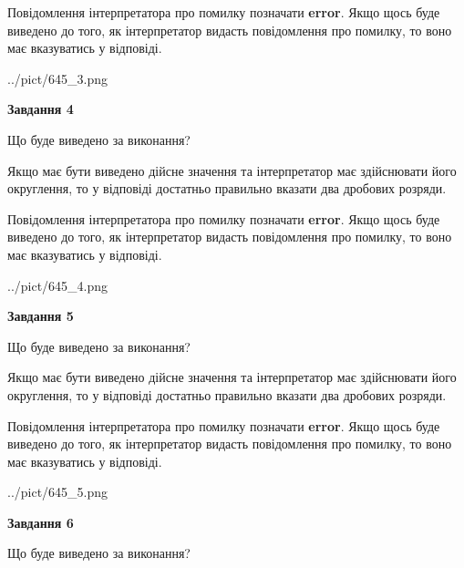 \documentclass[12pt, ukrainian]{article}
\begin{document}
{\begin {Large}
Повідомлення інтерпретатора про помилку позначати \textbf{error}.
Якщо щось буде виведено до того, як інтерпретатор видасть повідомлення про помилку, 
то воно має вказуватись у відповіді. \par

\begin{center}
	{../pict/645_3.png}
\end{center}
\newpage

{\begin {center}\textbf{Завдання 4}\end {center}}\par
Що буде виведено за виконання? \par

Якщо має бути виведено дійсне значення та інтерпретатор має здійснювати його округлення, 
то у відповіді достатньо правильно вказати два дробових розряди.

Повідомлення інтерпретатора про помилку позначати \textbf{error}.
Якщо щось буде виведено до того, як інтерпретатор видасть повідомлення про помилку, 
то воно має вказуватись у відповіді. \par

\begin{center}
	{../pict/645_4.png}
\end{center}
\newpage

{\begin {center}\textbf{Завдання 5}\end {center}}\par
Що буде виведено за виконання? \par

Якщо має бути виведено дійсне значення та інтерпретатор має здійснювати його округлення, 
то у відповіді достатньо правильно вказати два дробових розряди.

Повідомлення інтерпретатора про помилку позначати \textbf{error}.
Якщо щось буде виведено до того, як інтерпретатор видасть повідомлення про помилку, 
то воно має вказуватись у відповіді. \par

\begin{center}
	{../pict/645_5.png}
\end{center}
\newpage

{\begin {center}\textbf{Завдання 6}\end {center}}\par
Що буде виведено за виконання? \par


\end{Large}}
\end{document}
